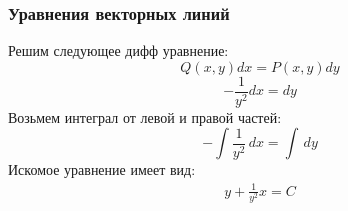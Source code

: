 \begin{frame}\frametitle{Уравнения векторных линий}
	Решим следующее дифф уравнение:
	\begin{equation*}
		Q(x, y)dx = P(x, y)dy
		\label{eq:vec_lines_definition}
	\end{equation*}
	\begin{equation*}
		-\frac{1}{y^2}dx = dy
		\label{eq:vec_lines_podst}
	\end{equation*}
	Возьмем интеграл от левой и правой частей:
	\begin{equation*}
		-\int \frac{1}{y^2} \, dx = \int \, dy
		\label{eq:vec_lines_int}
	\end{equation*}
	Искомое уравнение имеет вид:
	\begin{align*}
		y + \frac{1}{y^2}x = C
		\label{eq:vec_lines_integrated}
	\end{align*}

\end{frame}
